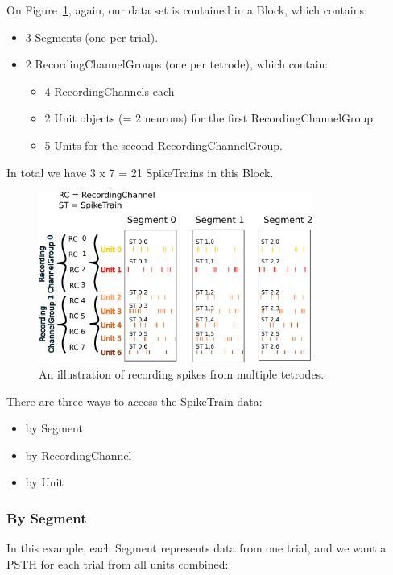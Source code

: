 \documentclass{frontiers}
\begin{document}
On Figure~\ref{fig:usecase2}, again, our data set is contained in a Block, which contains:

\begin{itemize}
\item 3 Segments (one per trial).
\item 2 RecordingChannelGroups (one per tetrode), which contain:
  \begin{itemize}
  \item 4 RecordingChannels each
  \item 2 Unit objects (= 2 neurons) for the first RecordingChannelGroup
  \item 5 Units for the second RecordingChannelGroup.
  \end{itemize}
\end{itemize}

In total we have 3 x 7 = 21 SpikeTrains in this Block.

\begin{figure}
\centering
\includegraphics[width=0.8\textwidth]{figures/usecase2}
\caption{An illustration of recording spikes from multiple tetrodes.}\label{fig:usecase2} 
\end{figure}



There are three ways to access the SpikeTrain data:
\begin{itemize}
\item by Segment
\item by RecordingChannel
\item by Unit
\end{itemize}

\subsubsection{By Segment}

In this example, each Segment represents data from one trial, and we want a PSTH for each trial from all units combined:
\end{document}
